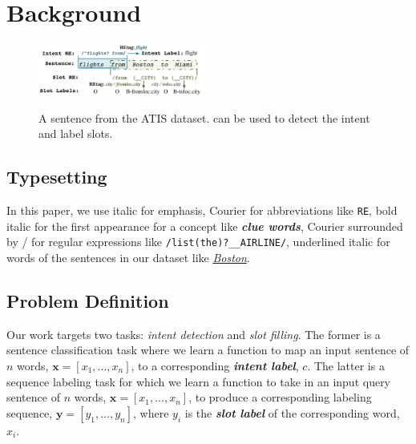 \section{Background}
\begin{figure}[t!]
  \centering
  \includegraphics[width=0.49\textwidth]{figure/motivation.pdf}\\
  \vspace{-3mm}
  \caption{A sentence from the ATIS dataset. \REs can be used to detect the intent and label slots.}
  \label{atis_sample}
  \vspace{-3mm}
\end{figure}

\vspace{-1mm}
\subsection{Typesetting}
\vspace{-1mm}
In this paper, we use italic for emphasis, Courier for abbreviations like \texttt{RE}, bold italic for the first appearance for a concept like \emph{\textbf{clue words}}, Courier surrounded by / for regular expressions like {\small \texttt{/list(\;the)?\;\_\_AIRLINE/}}, underlined italic for words of the sentences in our dataset like \underline{\textit{Boston}}.


\vspace{-1mm}
\subsection{Problem Definition}
\vspace{-1mm}
Our work targets two \SLU tasks: \emph{intent detection} and \emph{slot filling}. The former is a sentence classification task where we
learn a function to map an input sentence of $n$ words, $\textbf{x}=[x_{1}, ..., x_{n}]$, to a corresponding \textbf{\emph{intent label}},
$c$. The latter is a sequence labeling task for which we learn a function to take in an input query sentence of $n$ words,
$\textbf{x}=[x_{1}, ..., x_{n}]$, to produce a corresponding labeling sequence, $\textbf{y}=[y_{1}, ..., y_{n}]$, where  $y_i$ is the
\textbf{\emph{slot label}} of the
corresponding word, $x_i$. %


